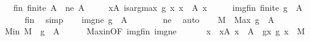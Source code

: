 \begin{isabellebody}
\ \ \ fin{\isacharcolon}{\kern0pt}\ {\isachardoublequoteopen}finite\ A{\isachardoublequoteclose}\ \ ne{\isacharcolon}{\kern0pt}\ {\isachardoublequoteopen}A\ {\isasymnoteq}\ {\isacharbraceleft}{\kern0pt}{\isacharbraceright}{\kern0pt}{\isachardoublequoteclose}\isanewline
\ \ \ {\isachardoublequoteopen}{\isasymexists}x{\isasymin}A{\isachardot}{\kern0pt}\ is{\isacharunderscore}{\kern0pt}arg{\isacharunderscore}{\kern0pt}max\ g\ {\isacharparenleft}{\kern0pt}{\isasymlambda}x{\isachardot}{\kern0pt}\ x\ {\isasymin}\ A{\isacharparenright}{\kern0pt}\ x{\isachardoublequoteclose}\isanewline
%
\isadelimproof
%
\endisadelimproof
%
\isatagproof
{}\isamarkupfalse%
\ {\isacharminus}{\kern0pt}\isanewline
\ \ \isamarkupfalse%
\ img{\isacharunderscore}{\kern0pt}fin{\isacharcolon}{\kern0pt}\ {\isachardoublequoteopen}finite\ {\isacharparenleft}{\kern0pt}g\ {\isacharbackquote}{\kern0pt}\ A{\isacharparenright}{\kern0pt}{\isachardoublequoteclose}\isanewline
\ \ \ \ \isamarkupfalse%
\ fin\ \isamarkupfalse%
\ simp\isanewline
\ \ \isamarkupfalse%
\ img{\isacharunderscore}{\kern0pt}ne{\isacharcolon}{\kern0pt}\ {\isachardoublequoteopen}g\ {\isacharbackquote}{\kern0pt}\ A\ {\isasymnoteq}\ {\isacharbraceleft}{\kern0pt}{\isacharbraceright}{\kern0pt}{\isachardoublequoteclose}\isanewline
\ \ \ \ \isamarkupfalse%
\ ne\ \isamarkupfalse%
\ auto\isanewline
\isanewline
\ \ \isamarkupfalse%
\ {\isacharquery}{\kern0pt}M\ {\isacharequal}{\kern0pt}\ {\isachardoublequoteopen}Max\ {\isacharparenleft}{\kern0pt}g\ {\isacharbackquote}{\kern0pt}\ A{\isacharparenright}{\kern0pt}{\isachardoublequoteclose}\isanewline
\ \ \isamarkupfalse%
\ M{\isacharunderscore}{\kern0pt}in{\isacharcolon}{\kern0pt}\ {\isachardoublequoteopen}{\isacharquery}{\kern0pt}M\ {\isasymin}\ g\ {\isacharbackquote}{\kern0pt}\ A{\isachardoublequoteclose}\isanewline
\ \ \ \ \isamarkupfalse%
\ Max{\isacharunderscore}{\kern0pt}in{\isacharbrackleft}{\kern0pt}OF\ img{\isacharunderscore}{\kern0pt}fin\ img{\isacharunderscore}{\kern0pt}ne{\isacharbrackright}{\kern0pt}\ \isakeywordONE{{\isachardot}{\kern0pt}}\isamarkupfalse%
\isanewline
\ \ \isamarkupfalse%
\ \isamarkupfalse%
\ x\ \ xA{\isacharcolon}{\kern0pt}\ {\isachardoublequoteopen}x\ {\isasymin}\ A{\isachardoublequoteclose}\ \ gx{\isacharcolon}{\kern0pt}\ {\isachardoublequoteopen}g\ x\ {\isacharequal}{\kern0pt}\ {\isacharquery}{\kern0pt}M{\isachardoublequoteclose}\isanewline

\end{isabellebody}
